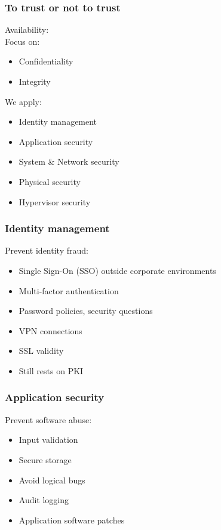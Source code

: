 \documentclass{beamer}
\begin{document}
\begin{frame}
    \frametitle{To trust or not to trust}

    Availability: \checkmark \\
    Focus on:
    \begin{itemize}
      \item Confidentiality
      \item Integrity
    \end{itemize}
    We apply:
    \begin{itemize} %
      \item Identity management
      \item Application security
      \item System \& Network security
      \item Physical security
      \item Hypervisor security %
    \end{itemize}
\end{frame}

\begin{frame}
    \frametitle{Identity management}
    Prevent identity fraud:
    \begin{itemize}
      \item Single Sign-On (SSO) outside corporate environments %
      \item Multi-factor authentication
      \item Password policies, security questions
      \item VPN connections
      \item SSL validity
      \item Still rests on PKI
    \end{itemize}
\end{frame}

\begin{frame}
    \frametitle{Application security}
    Prevent software abuse:
    \begin{itemize}
      \item Input validation
      \item Secure storage
      \item Avoid logical bugs
      \item Audit logging
      \item Application software patches
    \end{itemize}
\end{frame}
\end{document}
